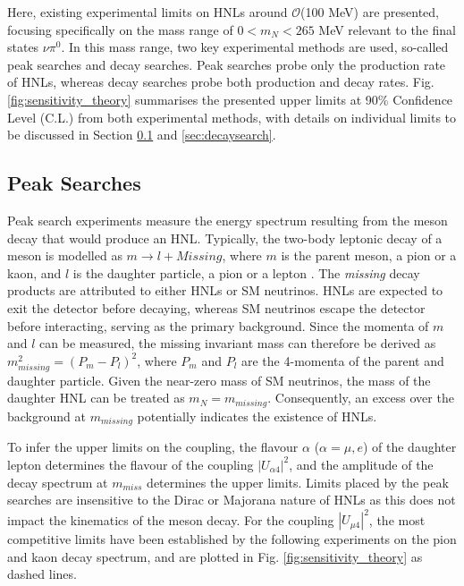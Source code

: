 Here, existing experimental limits on HNLs around $\mathcal{O}$(100 MeV) are presented, focusing specifically on the mass range of $ 0 < m_{N} < 265 $ MeV relevant to the final states $\nu\pi^{0}$.
In this mass range, two key experimental methods are used, so-called peak searches and decay searches.
Peak searches probe only the production rate of HNLs, whereas decay searches probe both production and decay rates.
Fig. \ref{fig:sensitivity_theory} summarises the presented upper limits at 90\% Confidence Level (C.L.) from both experimental methods, with details on individual limits to be discussed in Section \ref{sec:peaksearch} and \ref{sec:decaysearch}.

\subsection{Peak Searches}
\label{sec:peaksearch}

Peak search experiments measure the energy spectrum resulting from the meson decay that would produce an HNL. 
Typically, the two-body leptonic decay of a meson is modelled as $m\rightarrow l + Missing$, where $m$ is the parent meson, a pion or a kaon, and $l$ is the daughter particle, a pion or a lepton \cite{OwenPhD}.
The \textit{missing} decay products are attributed to either HNLs or SM neutrinos.
HNLs are expected to exit the detector before decaying, whereas SM neutrinos escape the detector before interacting, serving as the primary background.
Since the momenta of $m$ and $l$ can be measured, the missing invariant mass can therefore be derived as $m^{2}_{missing} = (P_{m} - P_{l})^{2}$, where $P_{m}$ and $P_{l}$ are the 4-momenta of the parent and daughter particle.
Given the near-zero mass of SM neutrinos, the mass of the daughter HNL can be treated as $m_{N} = m_{missing}$.
Consequently, an excess over the background at $m_{missing}$ potentially indicates the existence of HNLs.

To infer the upper limits on the coupling, the flavour $\alpha$ ($\alpha =\mu,e$) of the daughter lepton determines the flavour of the coupling $|U_{\alpha4}|^2$, and the amplitude of the decay spectrum at $m_{miss}$ determines the upper limits.
Limits placed by the peak searches are insensitive to the Dirac or Majorana nature of HNLs as this does not impact the kinematics of the meson decay.
For the coupling $|U_{\mu4}|^{2}$, the most competitive limits have been established by the following experiments on the pion and kaon decay spectrum, and are plotted in Fig. \ref{fig:sensitivity_theory} as dashed lines.

